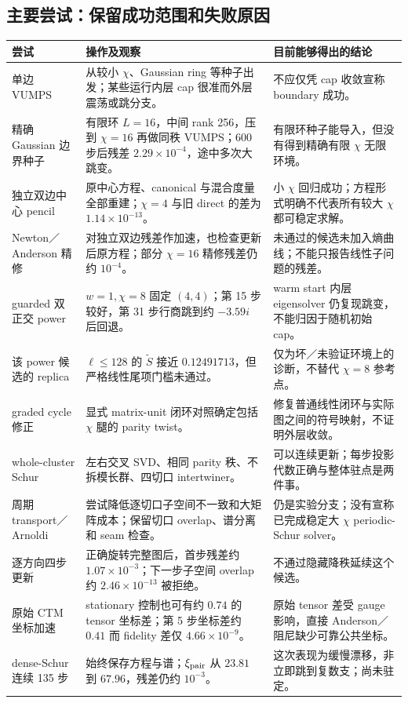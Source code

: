 \documentclass[11pt]{article}
\newcommand{\tS}{\widetilde S}
\begin{document}
\subsection{主要尝试：保留成功范围和失败原因}
\begin{longtable}{P{33mm}P{62mm}P{52mm}}
\toprule
尝试 & 操作及观察 & 目前能够得出的结论 \\
\midrule\endhead
单边 VUMPS & 从较小 $\chi$、Gaussian ring 等种子出发；某些运行内层 cap 很准而外层震荡或跳分支。 & 不应仅凭 cap 收敛宣称 boundary 成功。\\
精确 Gaussian 边界种子 & 有限环 $L=16$，中间 rank 256，压到 $\chi=16$ 再做同秩 VUMPS；600 步后残差 $2.29\times10^{-4}$，途中多次大跳变。 & 有限环种子能导入，但没有得到精确有限 $\chi$ 无限环境。\\
独立双边中心 pencil & 原中心方程、canonical 与混合度量全部重建；$\chi=4$ 与旧 direct 的差为 $1.14\times10^{-13}$。 & 小 $\chi$ 回归成功；方程形式明确不代表所有较大 $\chi$ 都可稳定求解。\\
Newton／Anderson 精修 & 对独立双边残差作加速，也检查更新后原方程；部分 $\chi=16$ 精修残差仍约 $10^{-4}$。 & 未通过的候选未加入熵曲线；不能只报告线性子问题的残差。\\
guarded 双正交 power & $w=1,\chi=8$ 固定 $(4,4)$；第 15 步较好，第 31 步行商跳到约 $-3.59i$ 后回退。 & warm start 内层 eigensolver 仍复现跳变，不能归因于随机初始 cap。\\
该 power 候选的 replica & $\ell\le128$ 的 $\tS$ 接近 $0.12491713$，但严格线性尾项门槛未通过。 & 仅为坏／未验证环境上的诊断，不替代 $\chi=8$ 参考点。\\
graded cycle 修正 & 显式 matrix-unit 闭环对照确定包括 $\chi$ 腿的 parity twist。 & 修复普通线性闭环与实际图之间的符号映射，不证明外层收敛。\\
whole-cluster Schur & 左右交叉 SVD、相同 parity 秩、不拆模长群、四切口 intertwiner。 & 可以连续更新；每步投影代数正确与整体驻点是两件事。\\
周期 transport／Arnoldi & 尝试降低逐切口子空间不一致和大矩阵成本；保留切口 overlap、谱分离和 seam 检查。 & 仍是实验分支；没有宣称已完成稳定大 $\chi$ periodic-Schur solver。\\
逐方向四步更新 & 正确旋转完整图后，首步残差约 $1.07\times10^{-3}$；下一步子空间 overlap 约 $2.46\times10^{-13}$ 被拒绝。 & 不通过隐藏降秩延续这个候选。\\
原始 CTM 坐标加速 & stationary 控制也可有约 $0.74$ 的 tensor 坐标差；第 5 步坐标差约 $0.41$ 而 fidelity 差仅 $4.66\times10^{-9}$。 & 原始 tensor 差受 gauge 影响，直接 Anderson／阻尼缺少可靠公共坐标。\\
dense-Schur 连续 135 步 & 始终保存方程与谱；$\xi_{\rm pair}$ 从 $23.81$ 到 $67.96$，残差仍约 $10^{-3}$。 & 这次表现为缓慢漂移，非立即跳到复数支；尚未驻定。\\
\bottomrule
\end{longtable}
\end{document}
